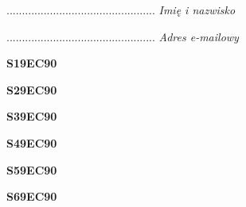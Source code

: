 \begin{turn}{90}\begin{minipage}{\linewidth} \vspace{20mm} ................................................  \textit{Imię i nazwisko}\end{minipage}\end{turn}

\begin{turn}{90}\begin{minipage}{\linewidth} \vspace{20mm} ................................................  \textit{Adres e-mailowy}\end{minipage}\end{turn}

\begin{turn}{90}\huge \begin{minipage}{\linewidth} \vspace{10mm}\textbf{S19EC90}\end{minipage}\end{turn}

\begin{turn}{90}\huge \begin{minipage}{\linewidth} \vspace{10mm}\textbf{S29EC90}\end{minipage}\end{turn}

\begin{turn}{90}\huge \begin{minipage}{\linewidth} \vspace{10mm}\textbf{S39EC90}\end{minipage}\end{turn}

\begin{turn}{90}\huge \begin{minipage}{\linewidth} \vspace{10mm}\textbf{S49EC90}\end{minipage}\end{turn}

\begin{turn}{90}\huge \begin{minipage}{\linewidth} \vspace{10mm}\textbf{S59EC90}\end{minipage}\end{turn}

\begin{turn}{90}\huge \begin{minipage}{\linewidth} \vspace{10mm}\textbf{S69EC90}\end{minipage}\end{turn}

